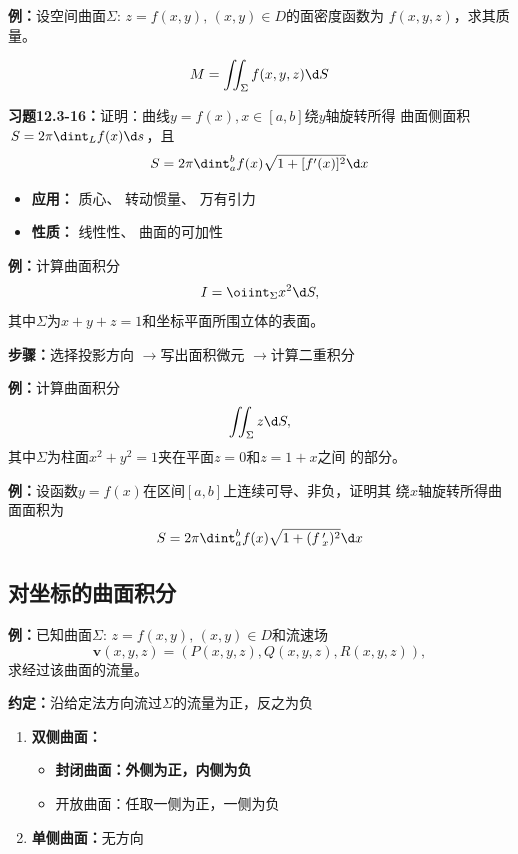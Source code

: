 {\bf 例：}设空间曲面$\Sigma:\,z=f(x,y),\,(x,y)\in D$的面密度函数为
$f(x,y,z)$，求其质量。

$${M=\iint_{\Sigma}f(x,y,z)\d S}$$

{\bf 习题12.3-16：}证明：曲线$y=f(x),x\in[a,b]$绕$y$轴旋转所得
曲面侧面积$S=2\pi\dint_Lf(x)\d s$，且
$$S=2\pi\dint_a^bf(x)\sqrt{1+[f'(x)]^2}\d x$$

\begin{itemize}
  \item {\bf 应用：} 质心、 转动惯量、 万有引力 
  \item {\bf 性质：} 线性性、 曲面的可加性
\end{itemize}

{\bf 例：}计算曲面积分
$$I=\oiint_{\Sigma}x^2\d S,$$
其中$\Sigma$为$x+y+z=1$和坐标平面所围立体的表面。

{\bf 步骤：}选择投影方向 $\to$写出面积微元 $\to$计算二重积分

{\bf 例：}计算曲面积分
$$\iint_{\Sigma}z\d S,$$
其中$\Sigma$为柱面$x^2+y^2=1$夹在平面$z=0$和$z=1+x$之间
的部分。

{\bf 例：}设函数$y=f(x)$在区间$[a,b]$上连续可导、非负，证明其
绕$x$轴旋转所得曲面面积为
$$S=2\pi\dint_a^bf(x)\sqrt{1+(f\,'_x)^2}\d x$$

\subsection{对坐标的曲面积分}

{\bf 例：}已知曲面$\Sigma:\,z=f(x,y),\,(x,y)\in D$和流速场
$$\bm{v}(x,y,z)=(P(x,y,z),Q(x,y,z),R(x,y,z)),$$
求经过该曲面的流量。

{\bf 约定：}沿给定法方向流过$\Sigma$的流量为正，反之为负

\begin{enumerate}
  \item {\bf 双侧曲面：}
  \begin{itemize}
    \item {\bf 封闭曲面：外侧为正，内侧为负}
    \item 开放曲面：任取一侧为正，一侧为负
  \end{itemize}
  \item {\bf 单侧曲面：}无方向
\end{enumerate}
\begin{center}
\end{center}

